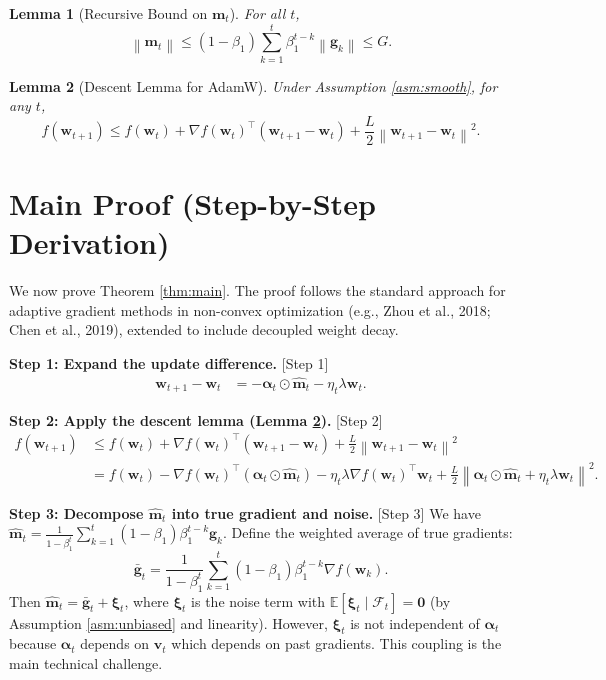 \documentclass{article}
\theoremstyle{plain}
\newtheorem{lemma}{Lemma}
\theoremstyle{definition}
\renewcommand{\vec}[1]{\boldsymbol{#1}}
\newcommand{\norm}[1]{\left\| #1 \right\|}
\newcommand{\expect}[1]{\mathbb{E}\left[ #1 \right]}
\begin{document}
\begin{lemma}[Recursive Bound on $\vec{m}_t$] \label{lem:m_bound}
For all $t$,
\begin{equation}
    \norm{\vec{m}_t} \le (1-\beta_1) \sum_{k=1}^t \beta_1^{t-k} \norm{\vec{g}_k} \le G.
\end{equation}
\end{lemma}

\begin{lemma}[Descent Lemma for AdamW] \label{lem:descent}
Under Assumption \ref{asm:smooth}, for any $t$,
\begin{equation}
    f(\vec{w}_{t+1}) \le f(\vec{w}_t) + \nabla f(\vec{w}_t)^\top (\vec{w}_{t+1} - \vec{w}_t) + \frac{L}{2} \norm{\vec{w}_{t+1} - \vec{w}_t}^2.
\end{equation}
\end{lemma}

\section*{Main Proof (Step-by-Step Derivation)}

We now prove Theorem \ref{thm:main}. The proof follows the standard approach for adaptive gradient methods in non-convex optimization (e.g., Zhou et al., 2018; Chen et al., 2019), extended to include decoupled weight decay.

\textbf{Step 1: Expand the update difference.} [Step 1]
\begin{align}
    \vec{w}_{t+1} - \vec{w}_t &= - \vec{\alpha}_t \odot \hat{\vec{m}}_t - \eta_t \lambda \vec{w}_t. \label{eq:diff}
\end{align}

\textbf{Step 2: Apply the descent lemma (Lemma \ref{lem:descent}).} [Step 2]
\begin{align}
    f(\vec{w}_{t+1}) &\le f(\vec{w}_t) + \nabla f(\vec{w}_t)^\top (\vec{w}_{t+1} - \vec{w}_t) + \frac{L}{2} \norm{\vec{w}_{t+1} - \vec{w}_t}^2 \\
    &= f(\vec{w}_t) - \nabla f(\vec{w}_t)^\top (\vec{\alpha}_t \odot \hat{\vec{m}}_t) - \eta_t \lambda \nabla f(\vec{w}_t)^\top \vec{w}_t + \frac{L}{2} \norm{\vec{\alpha}_t \odot \hat{\vec{m}}_t + \eta_t \lambda \vec{w}_t}^2. \label{eq:descent_expanded}
\end{align}

\textbf{Step 3: Decompose $\hat{\vec{m}}_t$ into true gradient and noise.} [Step 3]
We have $\hat{\vec{m}}_t = \frac{1}{1-\beta_1^t} \sum_{k=1}^t (1-\beta_1) \beta_1^{t-k} \vec{g}_k$. Define the weighted average of true gradients:
\begin{equation}
    \vec{\bar{g}}_t = \frac{1}{1-\beta_1^t} \sum_{k=1}^t (1-\beta_1) \beta_1^{t-k} \nabla f(\vec{w}_k).
\end{equation}
Then $\hat{\vec{m}}_t = \vec{\bar{g}}_t + \vec{\xi}_t$, where $\vec{\xi}_t$ is the noise term with $\expect{\vec{\xi}_t \mid \mathcal{F}_t} = \vec{0}$ (by Assumption \ref{asm:unbiased} and linearity). However, $\vec{\xi}_t$ is not independent of $\vec{\alpha}_t$ because $\vec{\alpha}_t$ depends on $\vec{v}_t$ which depends on past gradients. This coupling is the main technical challenge.
\end{document}

